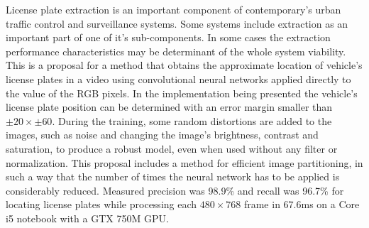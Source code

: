 
License plate extraction is an important component of contemporary's urban
traffic control and surveillance systems. 
Some systems include extraction as an important part of one of it's
sub-components.
In some cases the extraction performance characteristics may be determinant
of the whole system viability.
This is a proposal for a method that obtains the approximate location of
vehicle's license plates
in a video using convolutional neural networks applied directly to
the value of the RGB pixels.
In the implementation being presented the vehicle's license plate position can
be determined with an error margin smaller than $ \pm 20 \times \pm 60 $.
During the training, some random distortions are
added to the images, such as noise and changing the image's brightness,
contrast and saturation, to produce a robust model, even when used without any
filter or normalization. This proposal includes a method for efficient image
partitioning, in such a way that the number of times the neural network has to
be applied is considerably reduced.
Measured precision was 98.9\% and recall was 96.7\% for locating license
plates while processing each $480 \times 768$ frame in 67.6ms on
a Core i5 notebook with a GTX 750M GPU.
